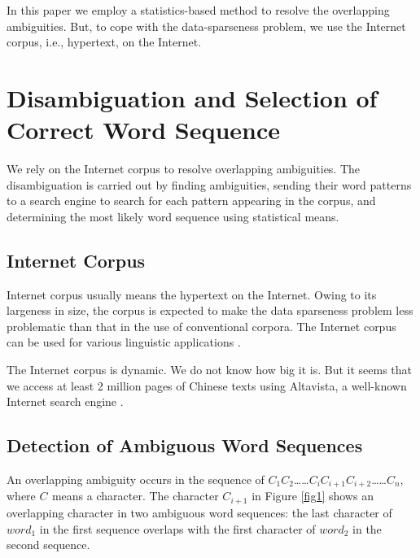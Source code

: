 In this paper we employ a statistics-based method to resolve the overlapping
ambiguities. But, to cope with the data-sparseness problem, we use the Internet
corpus, i.e., hypertext, on the Internet.

\section{Disambiguation and Selection of Correct Word Sequence}
\label{disambiguation}

We rely on the Internet corpus to resolve overlapping ambiguities.
The disambiguation is carried out by finding ambiguities,
sending their word patterns to a search engine to search for each pattern
appearing in the corpus, and determining the most likely word sequence
using statistical means.

\subsection{Internet Corpus}
\label{internet}

Internet corpus usually means the hypertext on the Internet.
Owing to its largeness in size, the corpus is expected to make the
data sparseness problem less problematic than that in the use
of conventional corpora. The Internet corpus can be used for various
linguistic applications \cite{Mihalcea99,Miyahara2000}.

The Internet corpus is dynamic. We do not know how big it is. 
But it seems that we access at least 2 million pages of Chinese texts
using Altavista, a well-known Internet search engine \cite{Altavista2000}.

\subsection{Detection of Ambiguous Word Sequences }
\label{detection}

An overlapping ambiguity occurs in the sequence of 
$C_{1}C_{2}$……$C_{i}C_{i+1}C_{i+2}$……$C_{n}$,
where $C_{}$ means a character. The character $C_{i+1}$ in Figure \ref{fig1} shows an
overlapping character in two ambiguous word sequences:
the last character of ${word}_{1}$ in the first sequence overlaps with the first
character of ${word}_{2}$ in the second sequence.

